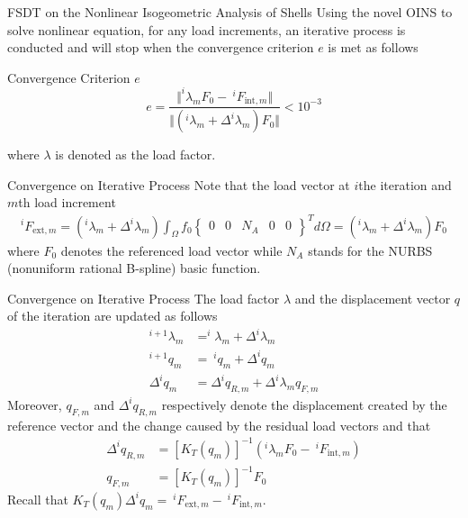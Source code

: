 \documentclass[
10pt,
aspectratio=169,
]{beamer}
\begin{document}
\begin{frame}{FSDT on the Nonlinear Isogeometric Analysis of Shells}
    Using the novel OINS to solve nonlinear equation, for any load increments, an iterative process is conducted and will stop when the convergence criterion \(e\) is met as follows

    \begin{block}{Convergence Criterion \(e\)}
        $$ e = \dfrac{\Vert ^i\lambda_m F_0 - \:^iF_{\text{int},m}\Vert}{\Vert (^i\lambda_m + \Delta^i\lambda_m)F_0\Vert} < 10^{-3}$$
    \end{block} \pause
    where \(\lambda\) is denoted as the load factor.
\end{frame}
\begin{frame}{Convergence on Iterative Process}
    Note that the load vector at \(i\)the iteration and \(m\)th load increment
    \begin{align}
        ^iF_{\text{ext},m} = \left(^i\lambda_m + \Delta^i\lambda_m\right)\int_{\Omega}f_0\left\{
        \begin{matrix}
            0 & 0 & N_A & 0 & 0
        \end{matrix}
        \right\}^Td\Omega
        = \left(^i\lambda_m + \Delta^i\lambda_m\right)F_0
    \end{align}
    where \(F_0\) denotes the referenced load vector while \(N_A\) stands for the NURBS (nonuniform rational B-spline) basic function.
\end{frame}
\begin{frame}{Convergence on Iterative Process}
    The load factor \(\lambda\) and the displacement vector \(q\) of the iteration are updated as follows
    \begin{align*}
        ^{i+1}\lambda_m &= ^i\lambda_m + \Delta^i\lambda_m \\
        ^{i+1}q_m &= \:^iq_m + \Delta^iq_m \\
        \Delta^iq_m &= \Delta^iq_{R,m} + \Delta^i\lambda_mq_{F,m}
    \end{align*} \pause
    Moreover, \(q_{F,m}\) and \(\Delta^iq_{R,m}\) respectively denote the displacement created by the reference vector and the change caused by the residual load vectors and that
    \begin{align}
        \Delta^iq_{R,m} &= [K_T(q_m)]^{-1}\left(^i\lambda_m F_0 - \:^iF_{\text{int},m}\right) \\
        q_{F,m} &= [K_T(q_m)]^{-1}F_0
    \end{align}
    \pause
    Recall that $K_T(q_m)\Delta^iq_m =\:^iF_{\text{ext},m} -\: ^iF_{\text{int},m}$.
\end{frame}
\end{document}
